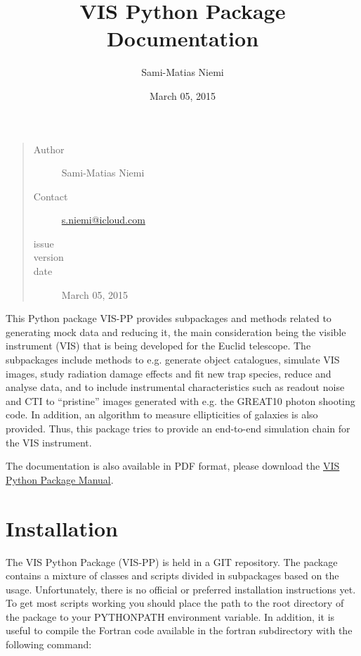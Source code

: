 \documentclass[a4paper,11pt,english]{sphinxmanual}
\title{VIS Python Package Documentation}
\date{March 05, 2015}
\author{Sami-Matias Niemi}
\begin{document}
\maketitle
\tableofcontents
{}\label{index::doc}

\begin{quote}\begin{description}
\item[{Author}] \leavevmode
Sami-Matias Niemi

\item[{Contact}] \leavevmode
\href{mailto:s.niemi@icloud.com}{s.niemi@icloud.com}

\item[{issue}] 

\item[{version}] 

\item[{date}] \leavevmode
March 05, 2015

\end{description}\end{quote}

This Python package VIS-PP provides subpackages and methods related to generating mock data and reducing it, the main
consideration being the visible instrument (VIS) that is being developed for the Euclid telescope.
The subpackages include methods to e.g. generate object catalogues, simulate VIS images,
study radiation damage effects and fit new trap species, reduce and analyse data, and to include instrumental
characteristics such as readout noise and CTI to ``pristine'' images generated with e.g. the GREAT10 photon
shooting code. In addition, an algorithm to measure ellipticities of galaxies is also provided. Thus,
this package tries to provide an end-to-end simulation chain for the VIS instrument.

The documentation is also available in PDF format, please download the \href{https://www.mssl.ucl.ac.uk/~smn2/Manual.pdf}{VIS Python Package Manual}.


\chapter{Installation}
\label{index:welcome-to-euclid-visible-instrument-vis-python-package-vis-pp-documentation}\label{index:installation}
The VIS Python Package (VIS-PP) is held in a GIT repository. The package contains a mixture of classes
and scripts divided in subpackages based on the usage. Unfortunately, there is no official or preferred
installation instructions yet. To get most scripts working you should place
the path to the root directory of the package to your PYTHONPATH environment variable. In addition, it is
useful to compile the Fortran code available in the fortran subdirectory with the following command:
\end{document}
